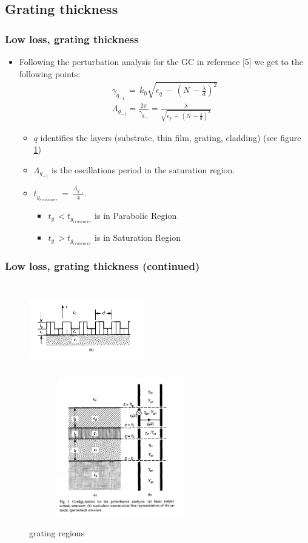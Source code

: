 \documentclass{beamer}
\begin{document}
%
\begin{frame}
\subsection{Grating thickness}
\frametitle{Low loss, grating thickness}
\begin{itemize}
\item  Following the perturbation analysis for the GC in reference [5] we  get to the following points:
\begin{eqnarray*}
\gamma_{q_{-1}} \, = \, k_0\sqrt{\epsilon_q \, - \, (N \, - \frac{\lambda}{d})^2 } \\
\Lambda_{g_{-1}} = \frac{2\pi}{\gamma_{g_{-1}} } =  \frac{\lambda}{\sqrt{\epsilon_g \, - \, (N \, - \frac{\lambda}{d})^2}  } 
\end{eqnarray*}
    \begin{itemize}
    \item $q$ identifies the layers (substrate, thin film, grating, cladding) (see figure \ref{gratingRegion1})
    \item $\Lambda_{g_{-1}}$ is the oscillations period in the saturation region.
    \item $t_{g_{cross over}} \, = \, \frac{\Lambda_{g_{-1}}}{4} $. 
    	\begin{itemize}
	\item $t_g \, < t_{g_{cross over}} $ is in Parabolic Region
	\item $t_g \, > t_{g_{cross over}} $ is in Saturation Region
	\end{itemize}
    \end{itemize}
\end{itemize}
\end{frame}
%
\begin{frame}
\frametitle{Low loss, grating thickness (continued)}
\begin{figure}[H]
\begin{center}
\includegraphics[width=5cm, height=4cm]{Figures/gratingStruc} 
\includegraphics[width=8cm, height=6cm]{Figures/perturbationAnalysis}
\caption{grating regions}
\label{gratingRegion1}
\end{center}
\end{figure}
\end{frame}
%
\end{document}
